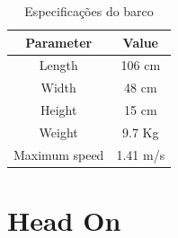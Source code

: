     \begin{table}[]
        \centering
        \begin{tabular}{cc}
            \textbf{Parameter}  & \textbf{Value}       \\ [2ex]\hline
            Length              & 106 cm      \\ [2ex]\hline
            Width               & 48 cm       \\ [2ex]\hline
            Height              & 15 cm       \\ [2ex]\hline
            Weight              & 9.7 Kg      \\ [2ex]\hline
            Maximum speed       & 1.41 m/s    \\ [2ex]\hline
        \end{tabular}
        \caption{Especificações do barco}
        \label{tab:chap5_boat_spec}
    \end{table}
    
    \section{Head On} \label{subchap5_headon}
        
